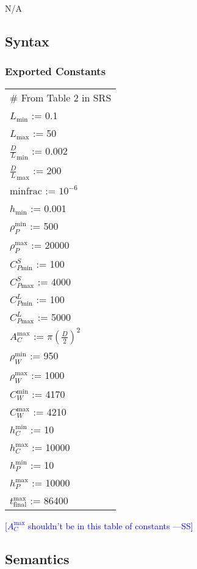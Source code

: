 \documentclass[12pt, titlepage]{article}
\newcommand{\authornote}[3]{\textcolor{#1}{[#3 ---#2]}}
\newcommand{\authornote}[3]{}
\newcommand{\wss}[1]{\authornote{blue}{SS}{#1}}
\begin{document}
N/A

\subsection{Syntax}

\subsubsection{Exported Constants}

\renewcommand{\arraystretch}{1.2}
\begin{longtable*}[l]{l} 
\# From Table 2 in SRS\\
  $L_\text{min}$ := 0.1\\
  $L_\text{max}$ := 50\\
  ${\frac{D}{L}}_\text{min}$ := 0.002 \\
  ${\frac{D}{L}}_\text{max}$ := 200 \\
  $\text{minfrac} $ := $10^{-6}$\\
  $h_\text{min}$ := 0.001 \\
  $\rho_P^{\text{min}}$ := 500\\
  $\rho_P^{\text{max}}$ := 20000\\
  $C_{P\text{min}}^S$ := 100 \\
  $C_{P\text{max}}^S$ := 4000\\
  $C_{P\text{min}}^L$ := 100 \\
  $C_{P\text{max}}^L$ := 5000\\
  $A_C^{\text{max}}$ := $\pi(\frac{D}{2})^2$\\
  $\rho_W^{\text{min}}$ := 950\\
  $\rho_W^{\text{max}}$ := 1000\\
  $C_W^{\text{min}}$ := 4170\\
  $C_W^{\text{max}}$ := 4210\\
  $h_C^{\text{min}}$ := 10\\
  $h_C^{\text{max}}$ := 10000\\
  $h_P^{\text{min}}$ := 10\\
  $h_P^{\text{max}}$ := 10000\\
  $t_{\text{final}}^{\text{max}}$ := 86400\\
\end{longtable*}

\wss{$A_C^{\text{max}}$ shouldn't be in this table of constants}

\subsection{Semantics}
\end{document}
